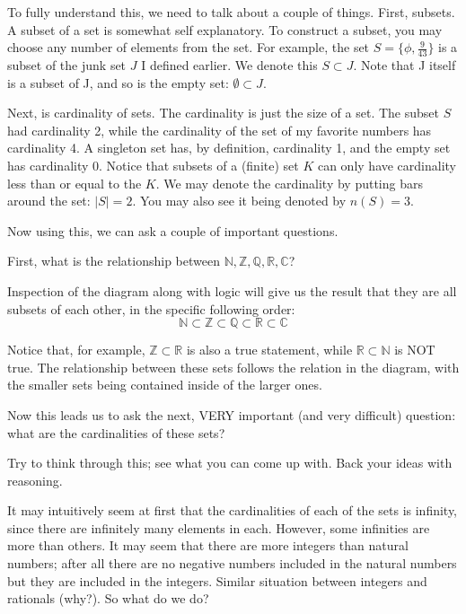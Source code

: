 To fully understand this, we need to talk about a couple of things. First, subsets. A subset of a set is somewhat self explanatory. To construct a subset, you may choose any number of elements from the set. For example, the set $S = \{\phi, \frac{9}{43}\}$ is a subset of the junk set $J$ I defined earlier. We denote this $S \subset J$. Note that J itself is a subset of J, and so is the empty set: $\emptyset \subset J$.

Next, is cardinality of sets. The cardinality is just the size of a set. The subset $S$ had cardinality 2, while the cardinality of the set of my favorite numbers has cardinality 4. A singleton set has, by definition, cardinality 1, and the empty set has cardinality 0. Notice that subsets of a (finite) set $K$ can only have cardinality less than or equal to the $K$. We may denote the cardinality by putting bars around the set: $|S| = 2$. You may also see it being denoted by $n(S) = 3$. 

Now using this, we can ask a couple of important questions.
\begin{exercise}
    First, what is the relationship between $\mathbb{N}, \mathbb{Z}, \mathbb{Q}, \mathbb{R}, \mathbb{C}$?
\end{exercise}

Inspection of the diagram along with logic will give us the result that they are all subsets of each other, in the specific following order:
\[\mathbb{N} \subset \mathbb{Z} \subset \mathbb{Q} \subset \mathbb{R} \subset \mathbb{C}\]

Notice that, for example, $\mathbb{Z} \subset \mathbb{R}$ is also a true statement, while $\mathbb{R} \subset \mathbb{N}$ is NOT true. The relationship between these sets follows the relation in the diagram, with the smaller sets being contained inside of the larger ones. 

Now this leads us to ask the next, VERY important (and very difficult) question: what are the cardinalities of these sets? 

\begin{exercise}
    Try to think through this; see what you can come up with. Back your ideas with reasoning.
\end{exercise}

It may intuitively seem at first that the cardinalities of each of the sets is infinity, since there are infinitely many elements in each. However, some infinities are more than others. It may seem that there are more integers than natural numbers; after all there are no negative numbers included in the natural numbers but they are included in the integers. Similar situation between integers and rationals (why?). So what do we do?

